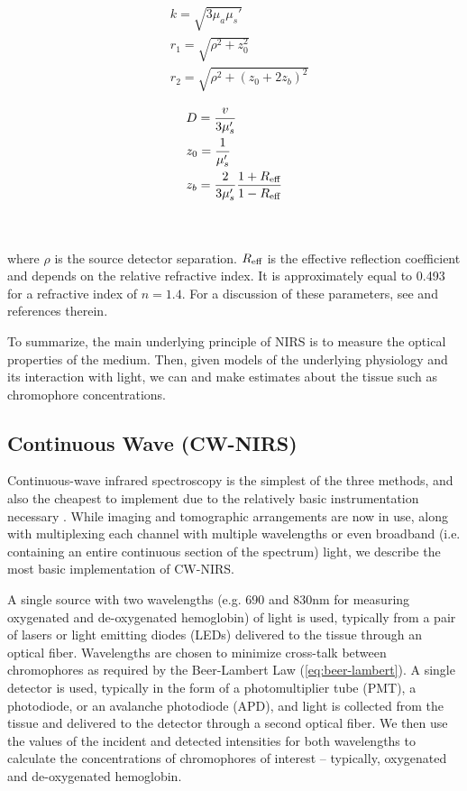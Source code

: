 \begin{minipage}{0.4\textwidth}
    \centering
    \begin{align}
        &k = \sqrt{3 \mu_a \mu_s'} \\
        &r_1 = \sqrt{\rho^2+z_0^2} \label{eq:flux_vars_first}\\ 
        &r_2 = \sqrt{\rho^2+(z_0+2z_b)^2} 
    \end{align}
\end{minipage}\hspace*{\fill}%
\begin{minipage}{0.4\textwidth}
    \centering
    \begin{align}
        &D = \frac{v}{3\mu_s'} \\
        &z_0 = \frac{1}{\mu_s'}\\
        &z_b = \frac{2}{3\mu_s'}\frac{1+R_{\textnormal{eff}}}{1-R_{\textnormal{eff}}} \label{eq:flux_vars_last}
    \end{align}
\end{minipage}
\\
\\
\noindent where $\rho$ is the source detector separation. $R_{\textnormal{eff}}$ is the effective reflection coefficient and depends on the relative refractive index. It is approximately equal to 0.493 for a refractive index of $n=1.4$. For a discussion of these parameters, see \cite{Farrell1992} and references therein.

To summarize, the main underlying principle of NIRS is to measure the optical properties of the medium. Then, given models of the underlying physiology and its interaction with light, we can and make estimates about the tissue such as chromophore concentrations. 

\subsection{Continuous Wave (CW-NIRS)} \label{sec:CW-NIRS}
Continuous-wave infrared spectroscopy is the simplest of the three methods, and also the cheapest to implement due to the relatively basic instrumentation necessary \cite{Scholkmann2013}. While imaging and tomographic arrangements are now in use, along with multiplexing each channel with multiple wavelengths or even broadband (i.e. containing an entire continuous section of the spectrum) light, we describe the most basic implementation of CW-NIRS. 

A single source with two wavelengths (e.g. 690 and 830nm for measuring oxygenated and de-oxygenated hemoglobin) of light is used, typically from a pair of lasers or light emitting diodes (LEDs) delivered to the tissue through an optical fiber. Wavelengths are chosen to minimize cross-talk between chromophores as required by the Beer-Lambert Law (\autoref{eq:beer-lambert}). A single detector is used, typically in the form of a photomultiplier tube (PMT), a photodiode, or an avalanche photodiode (APD), and light is collected from the tissue and delivered to the detector through a second optical fiber. We then use the values of the incident and detected intensities for both wavelengths to calculate the concentrations of chromophores of interest -- typically, oxygenated and de-oxygenated hemoglobin.

